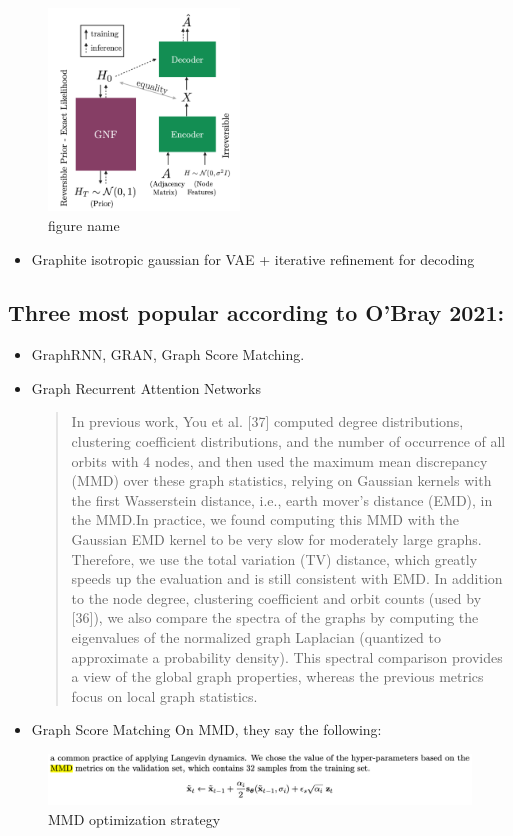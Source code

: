 \documentclass[12pt]{article}
\begin{document}
\begin{figure}[htbp]
\centering
\includegraphics[width=2.0in]{./images/full_arch_gnf.png}
\caption{\label{fig:Full architecture of the graph noramlizing flow DNN}figure name}
\end{figure}
\begin{itemize}
\item Graphite isotropic gaussian for VAE + iterative refinement for decoding
\end{itemize}
\subsection{Three most popular according to O'Bray 2021:}
\label{sec:org34a27ab}
\begin{itemize}
\item GraphRNN, GRAN, Graph Score Matching.

\item Graph Recurrent Attention Networks
\begin{quote}
In previous work, You et al. [37] computed degree distributions, clustering
coefficient distributions, and the number of occurrence of all orbits with 4
nodes, and then used the maximum mean discrepancy (MMD) over these graph
statistics, relying on Gaussian kernels with the first Wasserstein distance,
i.e., earth mover’s distance (EMD), in the MMD.In practice, we found computing
this MMD with the Gaussian EMD kernel to be very slow for moderately large
graphs. Therefore, we use the total variation (TV) distance, which greatly
speeds up the evaluation and is still consistent with EMD. In addition to the
node degree, clustering coefficient and orbit counts (used by [36]), we also
compare the spectra of the graphs by computing the eigenvalues of the
normalized graph Laplacian (quantized to approximate a probability density).
This spectral comparison provides a view of the global graph properties,
whereas the previous metrics focus on local graph statistics.
\end{quote}

\item Graph Score Matching
On MMD, they say the following:
\end{itemize}
\begin{figure}[htbp]
\centering
\includegraphics[width=\linewidth]{./images/MMD_settings_graph_score_matching_paper.png}
\caption{\label{fig:MMD settings for evaluation of the graph score matching model}MMD optimization strategy}
\end{figure}
\end{document}
